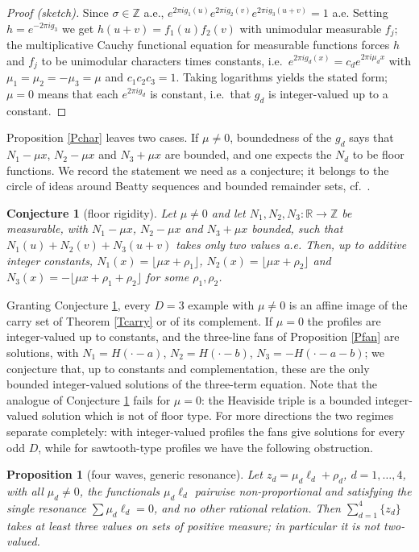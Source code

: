 \documentclass{article}
\newtheorem{proposition}{Proposition}
\newtheorem{conjecture}{Conjecture}
\def\R{{\mathbb R}}
\def\Z{{\mathbb Z}}
\begin{document}
	\begin{proof}[Proof (sketch)]
		Since $\sigma\in\Z$ a.e., $e^{2\pi ig_1(u)}e^{2\pi ig_2(v)}e^{2\pi ig_3(u+v)}=1$ a.e. Setting $h=e^{-2\pi ig_3}$ we get $h(u+v)=f_1(u)f_2(v)$ with unimodular measurable $f_j$; the multiplicative Cauchy functional equation for measurable functions forces $h$ and $f_j$ to be unimodular characters times constants, i.e.\ $e^{2\pi ig_d(x)}=c_de^{2\pi i\mu_dx}$ with $\mu_1=\mu_2=-\mu_3=\mu$ and $c_1c_2c_3=1$. Taking logarithms yields the stated form; $\mu=0$ means that each $e^{2\pi ig_d}$ is constant, i.e.\ that $g_d$ is integer-valued up to a constant.
	\end{proof}

	Proposition \ref{Pchar} leaves two cases. If $\mu\neq0$, boundedness of the $g_d$ says that $N_1-\mu x$, $N_2-\mu x$ and $N_3+\mu x$ are bounded, and one expects the $N_d$ to be floor functions. We record the statement we need as a conjecture; it belongs to the circle of ideas around Beatty sequences and bounded remainder sets, cf.\ \cite{Gr}.

	\begin{conjecture}[floor rigidity]\label{Lsturm}
		Let $\mu\neq0$ and let $N_1,N_2,N_3:\R\to\Z$ be measurable, with $N_1-\mu x$, $N_2-\mu x$ and $N_3+\mu x$ bounded, such that $N_1(u)+N_2(v)+N_3(u+v)$ takes only two values a.e. Then, up to additive integer constants, $N_1(x)=\lfloor\mu x+\rho_1\rfloor$, $N_2(x)=\lfloor\mu x+\rho_2\rfloor$ and $N_3(x)=-\lfloor\mu x+\rho_1+\rho_2\rfloor$ for some $\rho_1,\rho_2$.
	\end{conjecture}

	Granting Conjecture \ref{Lsturm}, every $D=3$ example with $\mu\neq0$ is an affine image of the carry set of Theorem \ref{Tcarry} or of its complement. If $\mu=0$ the profiles are integer-valued up to constants, and the three-line fans of Proposition \ref{Pfan} are solutions, with $N_1=H(\cdot-a)$, $N_2=H(\cdot-b)$, $N_3=-H(\cdot-a-b)$; we conjecture that, up to constants and complementation, these are the only bounded integer-valued solutions of the three-term equation. Note that the analogue of Conjecture \ref{Lsturm} fails for $\mu=0$: the Heaviside triple is a bounded integer-valued solution which is not of floor type. For more directions the two regimes separate completely: with integer-valued profiles the fans give solutions for every odd $D$, while for sawtooth-type profiles we have the following obstruction.

	\begin{proposition}[four waves, generic resonance]\label{Pfour}
		Let $z_d=\mu_d\ell_d+\rho_d$, $d=1,\dots,4$, with all $\mu_d\neq 0$, the functionals $\mu_d\ell_d$ pairwise non-proportional and satisfying the single resonance $\sum\mu_d\ell_d=0$, and no other rational relation. Then $\sum_{d=1}^4\{z_d\}$ takes at least three values on sets of positive measure; in particular it is not two-valued.
	\end{proposition}
\end{document}
